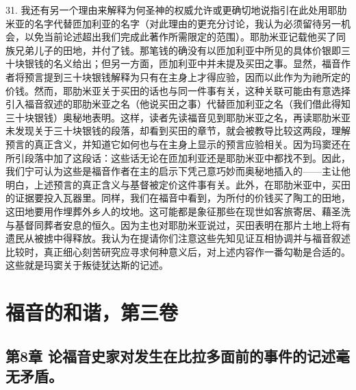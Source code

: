 31. 我还有另一个理由来解释为何圣神的权威允许或更确切地说指引在此处用耶肋米亚的名字代替匝加利亚的名字（对此理由的更充分讨论，我认为必须留待另一机会，以免当前论述超出我们完成此著作所需限定的范围）。耶肋米亚记载他买了同族兄弟儿子的田地，并付了钱。那笔钱的确没有以匝加利亚中所见的具体价银即三十块银钱的名义给出；但另一方面，匝加利亚中并未提及买田之事。显然，福音作者将预言提到三十块银钱解释为只有在主身上才得应验，因而以此作为为祂所定的价钱。然而，耶肋米亚关于买田的话也与同一件事有关，这种关联可能由有意选择引入福音叙述的耶肋米亚之名（他说买田之事）代替匝加利亚之名（我们借此得知三十块银钱）奥秘地表明。这样，读者先读福音见到耶肋米亚之名，再读耶肋米亚未发现关于三十块银钱的段落，却看到买田的章节，就会被教导比较这两段，理解预言的真正含义，并知道它如何也与在主身上显示的预言应验相关。因为玛窦还在所引段落中加了这段话：这些话无论在匝加利亚还是耶肋米亚中都找不到。因此，我们宁可认为这些是福音作者在主的启示下凭己意巧妙而奥秘地插入的——主让他明白，上述预言的真正含义与基督被定价这件事有关。此外，在耶肋米亚中，买田的证据要投入瓦器里。同样，我们在福音中看到，为所付的价钱买了陶工的田地，这田地要用作埋葬外乡人的坟地。这可能都是象征那些在现世如客旅寄居、藉圣洗与基督同葬者安息的恒久。因为主也对耶肋米亚说过，买田表明在那片土地上将有遗民从被掳中得释放。我认为在提请你们注意这些先知见证互相协调并与福音叙述比较时，真正细心刻苦研究应寻求何种意义后，对上述内容作一番勾勒是合适的。这些就是玛窦关于叛徒犹达斯的记述。\par



\section{福音的和谐，第三卷}


\subsection{第8章 论福音史家对发生在比拉多面前的事件的记述毫无矛盾。}

